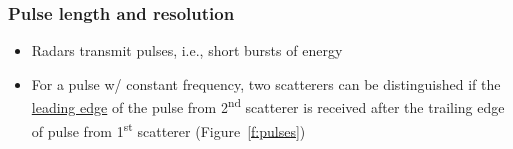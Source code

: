\documentclass[11pt, oneside]{article}
\begin{document}
\subsubsection{Pulse length and resolution}

\begin{itemize}
	\item[--] Radars transmit pulses, i.e., short bursts of energy
	\item[--] For a pulse w/ constant frequency, two scatterers can be distinguished if the \underline{leading edge} of the pulse from 2\textsuperscript{nd} scatterer is received after the trailing edge of pulse from 1\textsuperscript{st} scatterer (Figure~\ref{f:pulses})
\end{itemize}
\end{document}
